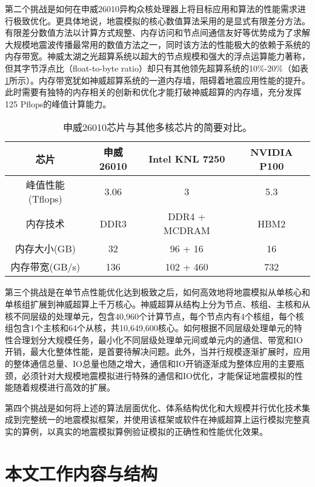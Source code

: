 第二个挑战是如何在申威26010异构众核处理器上将目标应用和算法的性能需求进行极致优化。更具体地说，地震模拟的核心数值算法采用的是显式有限差分方法。有限差分数值方法以计算方式规整、内存访问和节点间通信友好等优势成为了求解大规模地震波传播最常用的数值方法之一，同时该方法的性能极大的依赖于系统的内存带宽。神威太湖之光超算系统以超大的节点规模和强大的浮点运算能力著称，但其字节浮点比（float-to-byte ratio）却只有其他领先超算系统的10\%-20\%（如表\ref{tb:proc-comp}所示）。内存带宽犹如神威超算系统的一道内存墙，阻碍着地震应用性能的提升。此时需要有独特的内存相关的创新和优化才能打破神威超算的内存墙，充分发挥125 Pflops的峰值计算能力。

\begin{table}[ht]
\caption{申威26010芯片与其他多核芯片的简要对比。}
\label{tb:proc-comp}
\centering
\begin{tabular*}{0.8\columnwidth}{cccc}
\hline\hline
    芯片 & 申威26010 & Intel KNL 7250 & NVIDIA P100 \\\hline
    峰值性能 (Tflops) & 3.06 & 3 & 5.3 \\\hline
    内存技术   & DDR3 & DDR4 + MCDRAM & HBM2 \\\hline
    内存大小(GB) & 32 & 96 + 16 & 16 \\\hline
    内存带宽(GB/s)  & 136 & 102 + 460 & 732 \\\hline
\hline
\end{tabular*}
\end{table}

第三个挑战是在单节点性能优化达到极致之后，如何高效地将地震模拟从单核心和单核组扩展到神威超算上千万核心。神威超算从结构上分为节点、核组、主核和从核不同层级的处理单元，包含40,960个计算节点，每个节点内有4个核组，每个核组包含1个主核和64个从核，共10,649,600核心。如何根据不同层级处理单元的特性合理划分大规模任务，最小化不同层级处理单元间或单元内的通信、带宽和IO开销，最大化整体性能，是首要待解决问题。此外，当并行规模逐渐扩展时，应用的整体通信总量、IO总量也随之增大，通信和IO开销逐渐成为整体应用的主要瓶颈，必须针对大规模地震模拟进行特殊的通信和IO优化，才能保证地震模拟的性能随着规模进行高效的扩展。

第四个挑战是如何将上述的算法层面优化、体系结构优化和大规模并行优化技术集成到完整统一的地震模拟框架，并使用该框架或软件在神威超算上运行模拟完整真实的算例，以真实的地震模拟算例验证模拟的正确性和性能优化效果。

\section{本文工作内容与结构}

